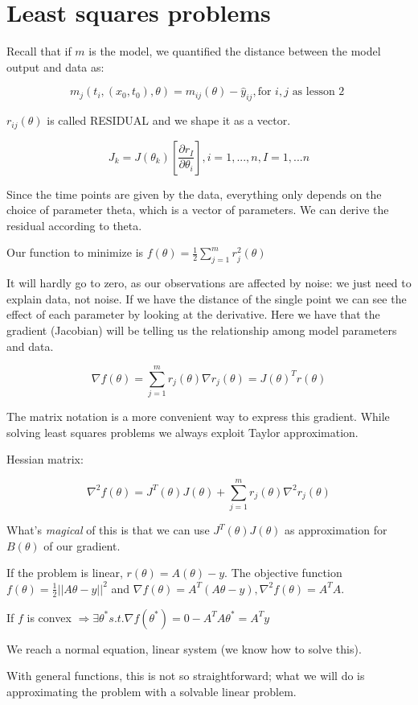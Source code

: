 \hypertarget{least-squares-problems}{%
\section{Least squares problems}\label{least-squares-problems}}

Recall that if $m$ is the model, we quantified the distance between the
model output and data as:

$$
m_j(t_i,(x_0,t_0), \theta) = m_{ij}(\theta) - \hat{y}_{ij}, \text{for } i,j \text{ as lesson 2 } 
$$

$r_{ij}(\theta)$ is called RESIDUAL and we shape it as a vector.

$$
J_k=J(\theta_k)[\frac{\partial r_I}{\partial\theta_i}], i=1, ...,n, I=1,...n
$$

Since the time points are given by the data, everything only depends on
the choice of parameter theta, which is a vector of parameters. We can
derive the residual according to theta.

Our function to minimize is
$f(\theta)=\frac{1}{2}\sum^m_{j=1}r_j^2(\theta)$

It will hardly go to zero, as our observations are affected by noise: we
just need to explain data, not noise. If we have the distance of the
single point we can see the effect of each parameter by looking at the
derivative. Here we have that the gradient (Jacobian) will be telling us
the relationship among model parameters and data.

$$
\nabla f(\theta)=\sum^m_{j=1}r_j(\theta)\nabla r_j(\theta)= J(\theta)^Tr(\theta)
$$

The matrix notation is a more convenient way to express this gradient.
While solving least squares problems we always exploit Taylor
approximation.

Hessian matrix:

$$
\nabla^2 f(\theta)=J^T(\theta)J(\theta)+ \sum^m_{j=1}r_j(\theta) \nabla^2 r_j(\theta)
$$

What's \emph{magical} of this is that we can use $J^T(\theta)J(\theta)$
as approximation for $B(\theta)$ of our gradient.

If the problem is linear, $r(\theta)=A(\theta)-y$. The objective
function $f(\theta)=\frac{1}{2} || A\theta-y||^2$ and
$\nabla f(\theta)=A^T(A\theta-y), \nabla^2 f(\theta)=A^TA$.

If $f$ is convex
$\Rightarrow \exists \theta^* s.t. \nabla f(\theta^*)=0 - A^TA\theta^*=A^Ty$

We reach a normal equation, linear system (we know how to solve this).

With general functions, this is not so straightforward; what we will do
is approximating the problem with a solvable linear problem.
